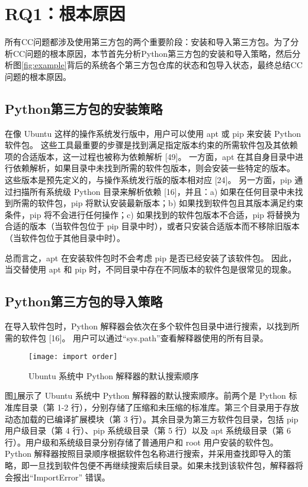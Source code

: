 \section{RQ1：根本原因}
所有CC问题都涉及使用第三方包的两个重要阶段：安装和导入第三方包。为了分析CC问题的根本原因，本节首先分析Python第三方包的安装和导入策略，然后分析图\ref{fig:example}背后的系统各个第三方包仓库的状态和包导入状态，最终总结CC问题的根本原因。

\subsection{Python第三方包的安装策略}
在像 Ubuntu 这样的操作系统发行版中，用户可以使用 apt 或 pip 来安装 Python 软件包。
这些工具最重要的步骤是找到满足指定版本约束的所需软件包及其依赖项的合适版本，这一过程也被称为依赖解析 [49]。
一方面，apt 在其自身目录中进行依赖解析，如果目录中未找到所需的软件包版本，则会安装一些特定的版本。
这些版本是预先定义的，与操作系统发行版的版本相对应 [24]。
另一方面，pip 通过扫描所有系统级 Python 目录来解析依赖 [16]，并且：a) 如果在任何目录中未找到所需的软件包，pip 将默认安装最新版本；b) 如果找到软件包且其版本满足约束条件，pip 将不会进行任何操作；c) 如果找到的软件包版本不合适，pip 将替换为合适的版本（当软件包位于 pip 目录中时），或者只安装合适版本而不移除旧版本（当软件包位于其他目录中时）。

总而言之，apt 在安装软件包时不会考虑 pip 是否已经安装了该软件包。
因此，当交替使用 apt 和 pip 时，不同目录中存在不同版本的软件包是很常见的现象。

\subsection{Python第三方包的导入策略}
在导入软件包时，Python 解释器会依次在多个软件包目录中进行搜索，以找到所需的软件包 [16]。
用户可以通过“sys.path”查看解释器使用的所有目录。
\begin{figure}[htbp] %
	\centering
	\texttt{[image: import order]}
	\caption{Ubuntu 系统中 Python 解释器的默认搜索顺序}
	\label{fig:order}
\end{figure}
图\ref{fig:order}展示了 Ubuntu 系统中 Python 解释器的默认搜索顺序。前两个是 Python 标准库目录（第 1-2 行），分别存储了压缩和未压缩的标准库。第三个目录用于存放动态加载的已编译扩展模块（第 3 行）。其余目录为第三方软件包目录，包括 pip 用户级目录（第 4 行）、pip 系统级目录（第 5 行）以及 apt 系统级目录（第 6 行）。用户级和系统级目录分别存储了普通用户和 root 用户安装的软件包。Python 解释器按照目录顺序根据软件包名称进行搜索，并采用查找即导入的策略，即一旦找到软件包便不再继续搜索后续目录。如果未找到该软件包，解释器将会报出“ImportError” 错误。

